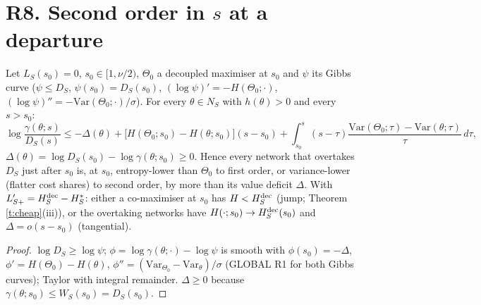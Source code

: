 \documentclass[11pt]{article}
\theoremstyle{remark}\newtheorem{remark}[theorem]{Remark}
\begin{document}
\section{R8. Second order in $s$ at a departure}
\begin{lemma}\label{l:dep}
Let $L_S(s_0)=0$, $s_0\in[1,\nu/2)$, $\Theta_0$ a decoupled maximiser at $s_0$ and $\psi$ its Gibbs curve ($\psi\le D_S$, $\psi(s_0)=D_S(s_0)$,
$(\log\psi)'=-H(\Theta_0;\cdot)$, $(\log\psi)''=-\mathrm{Var}(\Theta_0;\cdot)/\sigma$). For every $\theta\in N_S$ with $h(\theta)>0$ and every $s>s_0$:
\[\log\frac{\gamma(\theta;s)}{D_S(s)}\le-\Delta(\theta)+\big[H(\Theta_0;s_0)-H(\theta;s_0)\big](s-s_0)+\int_{s_0}^{s}(s-\tau)\frac{\mathrm{Var}(\Theta_0;\tau)-\mathrm{Var}(\theta;\tau)}\tau\,d\tau,\]
$\Delta(\theta)=\log D_S(s_0)-\log\gamma(\theta;s_0)\ge0$. Hence every network that overtakes $D_S$ just after $s_0$ is, at $s_0$, entropy-lower than $\Theta_0$ to first order,
or variance-lower (flatter cost shares) to second order, by more than its value deficit $\Delta$. With $L'_{S+}=H^{\rm dec}_S-H^*_S$: either a co-maximiser at $s_0$
has $H<H^{\rm dec}_S$ (jump; Theorem \ref{t:cheap}(iii)), or the overtaking networks have $H(\cdot;s_0)\to H^{\rm dec}_S(s_0)$ and $\Delta=o(s-s_0)$ (tangential).
\end{lemma}
\begin{proof}
$\log D_S\ge\log\psi$; $\phi=\log\gamma(\theta;\cdot)-\log\psi$ is smooth with $\phi(s_0)=-\Delta$, $\phi'=H(\Theta_0)-H(\theta)$, $\phi''=(\mathrm{Var}_{\Theta_0}-\mathrm{Var}_\theta)/\sigma$
(GLOBAL R1 for both Gibbs curves); Taylor with integral remainder. $\Delta\ge0$ because $\gamma(\theta;s_0)\le W_S(s_0)=D_S(s_0)$.
\end{proof}
\end{document}
